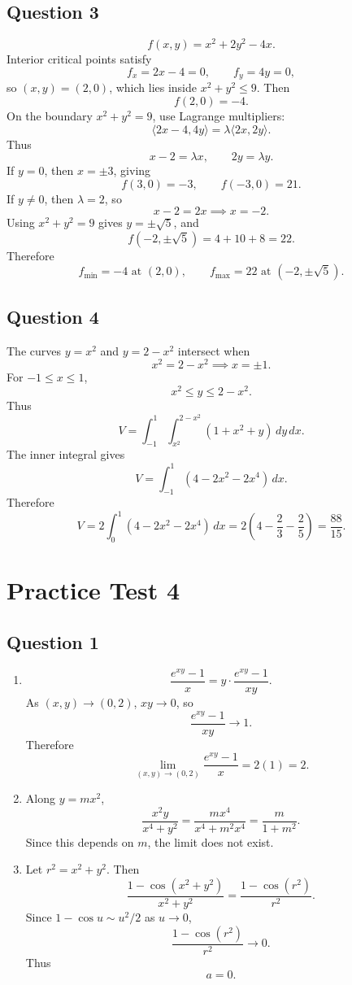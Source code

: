 \documentclass[11pt]{article}
\begin{document}
\subsection*{Question 3}
\[
f(x,y)=x^2+2y^2-4x.
\]
Interior critical points satisfy
\[
f_x=2x-4=0,\qquad f_y=4y=0,
\]
so $(x,y)=(2,0)$, which lies inside $x^2+y^2\le 9$. Then
\[
f(2,0)=-4.
\]
On the boundary $x^2+y^2=9$, use Lagrange multipliers:
\[
\langle 2x-4,4y\rangle=\lambda\langle 2x,2y\rangle.
\]
Thus
\[
x-2=\lambda x,\qquad 2y=\lambda y.
\]
If $y=0$, then $x=\pm3$, giving
\[
f(3,0)=-3,\qquad f(-3,0)=21.
\]
If $y\ne0$, then $\lambda=2$, so
\[
x-2=2x \implies x=-2.
\]
Using $x^2+y^2=9$ gives $y=\pm\sqrt5$, and
\[
f(-2,\pm\sqrt5)=4+10+8=22.
\]
Therefore
\[
\boxed{f_{\min}=-4\text{ at }(2,0)},\qquad
\boxed{f_{\max}=22\text{ at }(-2,\pm\sqrt5)}.
\]

\subsection*{Question 4}
The curves $y=x^2$ and $y=2-x^2$ intersect when
\[
x^2=2-x^2 \implies x=\pm1.
\]
For $-1\le x\le 1$,
\[
x^2\le y\le 2-x^2.
\]
Thus
\[
V=\int_{-1}^1\int_{x^2}^{2-x^2}(1+x^2+y)\,dy\,dx.
\]
The inner integral gives
\[
V=\int_{-1}^1(4-2x^2-2x^4)\,dx.
\]
Therefore
\[
V=2\int_0^1(4-2x^2-2x^4)\,dx
=2\left(4-\frac23-\frac25\right)
=\boxed{\frac{88}{15}}.
\]

\section*{Practice Test 4}

\subsection*{Question 1}
\begin{enumerate}[label=\alph*)]
\item
\[
\frac{e^{xy}-1}{x}
=y\cdot\frac{e^{xy}-1}{xy}.
\]
As $(x,y)\to(0,2)$, $xy\to0$, so
\[
\frac{e^{xy}-1}{xy}\to1.
\]
Therefore
\[
\lim_{(x,y)\to(0,2)}\frac{e^{xy}-1}{x}
=2(1)=\boxed{2}.
\]

\item
Along $y=mx^2$,
\[
\frac{x^2y}{x^4+y^2}
=\frac{mx^4}{x^4+m^2x^4}
=\frac{m}{1+m^2}.
\]
Since this depends on $m$, the limit does not exist.

\item
Let $r^2=x^2+y^2$. Then
\[
\frac{1-\cos(x^2+y^2)}{x^2+y^2}
=\frac{1-\cos(r^2)}{r^2}.
\]
Since $1-\cos u\sim u^2/2$ as $u\to0$,
\[
\frac{1-\cos(r^2)}{r^2}\to0.
\]
Thus
\[
\boxed{a=0}.
\]
\end{enumerate}
\end{document}
